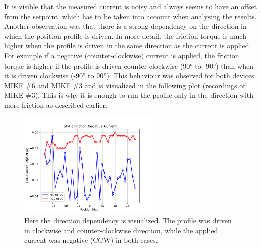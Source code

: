It is visible that the measured current is noisy and always seems to have an offset from the setpoint, which has to be taken into account when analysing the results. \\

Another observation was that there is a strong dependency on the direction in which the position profile is driven. In more detail, the friction torque is much higher when the profile is driven in the same direction as the current is applied. For example if a negative (counter-clockwise) current is applied, the friction torque is higher if the profile is driven counter-clockwise (90° to -90°) than when it is driven clockwise (-90° to 90°). This behaviour was observed for both devices MIKE \#6 and MIKE \#3 and is visualized in the following plot (recordings of MIKE \#3). This is why it is enough to run the profile only in the direction with more friction as described earlier.

\begin{figure}
    \centering
    \includegraphics[width = 0.6\textwidth]{chapters/static friction/cw_vs_ccw.pdf}
    \caption{Here the direction dependency is visualized. The profile was driven in clockwise and counter-clockwise direction, while the applied current was negative (CCW) in both cases.}
\end{figure}